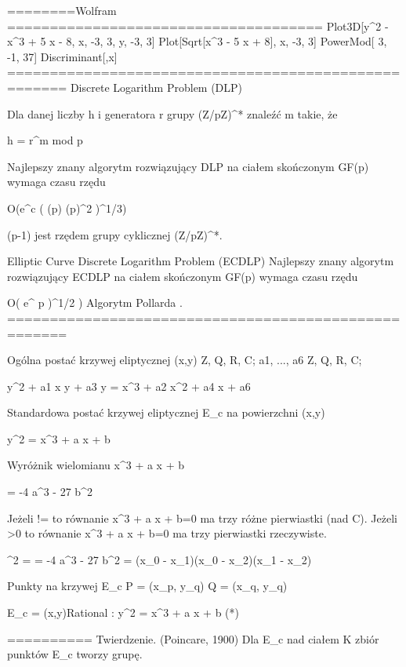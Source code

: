 ﻿

========Wolfram =====================================
Plot3D[y^2 - x^3 + 5 x - 8, {x, -3, 3}, {y, -3, 3}]
Plot[Sqrt[x^3 - 5 x + 8], {x, -3, 3}]
PowerMod[ 3, -1, 37]
Discriminant[,x]
=====================================================
Discrete Logarithm Problem (DLP)

Dla danej liczby h i generatora r grupy (Z/pZ)^{*} znaleźć  m takie, że

                             h = r^m  mod p

Najlepszy znany algorytm rozwiązujący DLP na ciałem skończonym GF(p) wymaga czasu rzędu

                O(e^{c ( (\log p) (\log \log p)^2 )^{1/3}})
                
(p-1) jest rzędem grupy cyklicznej (Z/pZ)^{*}.


Elliptic Curve Discrete Logarithm Problem (ECDLP)
Najlepszy znany algorytm rozwiązujący ECDLP na ciałem skończonym GF(p) wymaga czasu rzędu

                    O( e^{ \log p )^{1/2} } )
Algorytm Pollarda \rho.
=====================================================

Ogólna postać krzywej eliptycznej
                    (x,y) \in Z, Q, R, C;
               a1, ..., a6 \in Z, Q, R, C;
          
            y^2 + a1 x y +  a3 y = x^3 + a2 x^2 + a4 x + a6

Standardowa postać krzywej eliptycznej E_{c} na powierzchni (x,y)

                  y^2 = x^3 + a x + b

Wyróżnik wielomianu  x^3 + a x + b       %

              \Delta = -4 a^3 - 27 b^2

Jeżeli \Delta !=  to równanie  x^3 + a x + b=0  ma trzy różne pierwiastki (nad C).
Jeżeli \Delta >0  to równanie  x^3 + a x + b=0  ma trzy pierwiastki rzeczywiste.

              \delta^2 = \Delta = -4 a^3 - 27 b^2
              \delta = (x_0 - x_1)(x_0 - x_2)(x_1 - x_2)

Punkty na krzywej E_{c}
                        P = (x_p, y_q)
                        Q = (x_q, y_q)

      E_{c} = {(x,y)\in Rational : y^2 = x^3 + a x + b  }   (*)
      
==========
Twierdzenie. (Poincare, 1900)
              Dla E_{c} nad ciałem K zbiór punktów E_{c} tworzy grupę.

